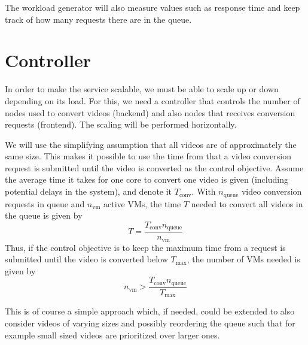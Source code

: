 \documentclass[a4paper, 10pt, english]{article}
\begin{document}
The workload generator will also measure values such as response time and keep track of how many requests there are in the queue.
\section{Controller} \label{sec:Controller}
In order to make the service scalable, we must be able to scale up or down depending on its load. For this, we need a controller that controls the number of nodes used to convert videos (backend) and also nodes that receives conversion requests (frontend). The scaling will be performed horizontally.

We will use the simplifying assumption that all videos are of approximately the same size. This makes it possible to use the time from that a video conversion request is submitted until the video is converted as the control objective. Assume the average time it takes for one core to convert one video is given (including potential delays in the system), and denote it $ T_{\text{conv}} $. With $ n_{\text{queue}} $ video conversion requests in queue and $ n_{\text{vm}} $ active VMs, the time $ T $ needed to convert all videos in the queue is given by
\begin{equation}
T = \frac{T_{\text{conv}}  n_{\text{queue}}}{n_{\text{vm}}}
\end{equation}
Thus, if the control objective is to keep the maximum time from a request is submitted until the video is converted below $ T_{\text{max}} $, the number of VMs needed is given by
\begin{equation}
n_{\text{vm}} > \frac{T_{\text{conv}}  n_{\text{queue}}}{T_{\text{max}}}
\end{equation}

This is of course a simple approach which, if needed, could be extended to also consider videos of varying sizes and possibly reordering the queue such that for example small sized videos are prioritized over larger ones.
\end{document}
